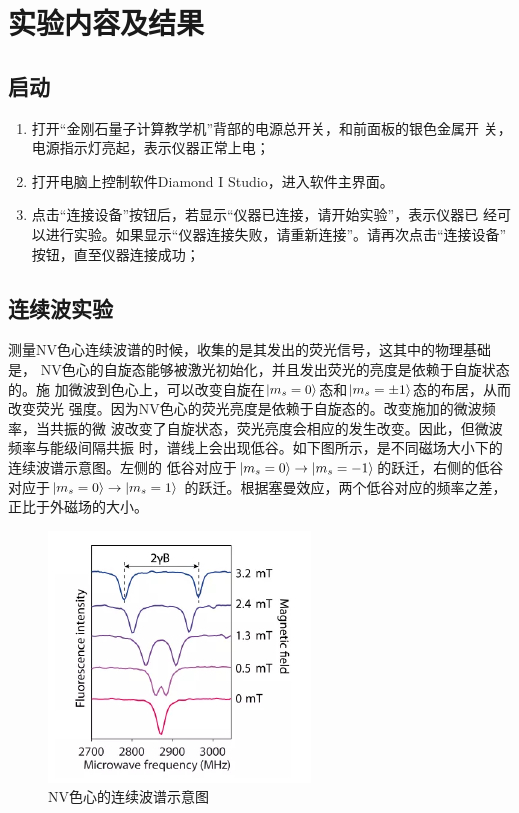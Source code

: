 \documentclass[a4paper]{article}
\begin{document}
\section{实验内容及结果}
\subsection{启动}
\begin{enumerate}
	\item 打开“金刚石量子计算教学机”背部的电源总开关，和前面板的银色金属开
	关，电源指示灯亮起，表示仪器正常上电；
	\item  打开电脑上控制软件Diamond I Studio，进入软件主界面。%
	\item  点击“连接设备”按钮后，若显示“仪器已连接，请开始实验”，表示仪器已
	经可以进行实验。如果显示“仪器连接失败，请重新连接”。请再次点击“连接设备”
	按钮，直至仪器连接成功；	
\end{enumerate}

\subsection{连续波实验}
测量NV色心连续波谱的时候，收集的是其发出的荧光信号，这其中的物理基础是，
NV色心的自旋态能够被激光初始化，并且发出荧光的亮度是依赖于自旋状态的。施
加微波到色心上，可以改变自旋在$ \ket{m_s=0} $态和$ \ket{m_s=\pm 1} $态的布居，从而改变荧光
强度。因为NV色心的荧光亮度是依赖于自旋态的。改变施加的微波频率，当共振的微
波改变了自旋状态，荧光亮度会相应的发生改变。因此，但微波频率与能级间隔共振
时，谱线上会出现低谷。如下图所示，是不同磁场大小下的连续波谱示意图。左侧的
低谷对应于$ \ket{m_s=0} \rightarrow \ket{m_s=-1} $的跃迁，右侧的低谷对应于$ \ket{m_s=0} \rightarrow \ket{m_s=1} $
的跃迁。根据塞曼效应，两个低谷对应的频率之差，正比于外磁场的大小。
\begin{figure}[H]
	\centering
	\includegraphics[width=0.4\linewidth]{fig/cont.jpg}
	\caption{NV色心的连续波谱示意图}
	\label{fig:cont}
\end{figure}
\end{document}

